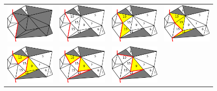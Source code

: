 \begin{figure}[tp]
\centering
 \begin{tabular}{cccc}
  \includegraphics[width=0.24\columnwidth]{./img/ch_soa/incrementalGrowing00}&
  \includegraphics[width=0.24\columnwidth]{./img/ch_soa/incrementalGrowing01}&
  \includegraphics[width=0.24\columnwidth]{./img/ch_soa/incrementalGrowing02}&
  \includegraphics[width=0.24\columnwidth]{./img/ch_soa/incrementalGrowing03}\\
  \includegraphics[width=0.24\columnwidth]{./img/ch_soa/incrementalGrowing04}&
  \includegraphics[width=0.24\columnwidth]{./img/ch_soa/incrementalGrowing05}&
  \includegraphics[width=0.24\columnwidth]{./img/ch_soa/incrementalGrowing06}&

\end{tabular}
\end{figure}
